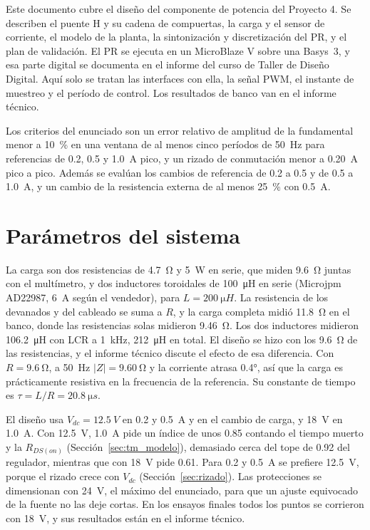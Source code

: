 \documentclass[journal]{IEEEtran}
\begin{document}
Este documento cubre el diseño del componente de potencia del Proyecto 4. Se describen el puente H y su cadena de compuertas, la carga y el sensor de corriente, el modelo de la planta, la sintonización y discretización del PR, y el plan de validación. El PR se ejecuta en un MicroBlaze V sobre una Basys~3, y esa parte digital se documenta en el informe del curso de Taller de Diseño Digital. Aquí solo se tratan las interfaces con ella, la señal PWM, el instante de muestreo y el período de control. Los resultados de banco van en el informe técnico.

Los criterios del enunciado \cite{enunciado} son un error relativo de amplitud de la fundamental menor a \SI{10}{\percent} en una ventana de al menos cinco períodos de \SI{50}{Hz} para referencias de \num{0.2}, \num{0.5} y \SI{1.0}{A} pico, y un rizado de conmutación menor a \SI{0.20}{A} pico a pico. Además se evalúan los cambios de referencia de \num{0.2} a \num{0.5} y de \num{0.5} a \SI{1.0}{A}, y un cambio de la resistencia externa de al menos \SI{25}{\percent} con \SI{0.5}{A}.

\section{Parámetros del sistema}
\label{sec:param}
La carga son dos resistencias de \SI{4.7}{\ohm} y \SI{5}{W} en serie, que miden \SI{9.6}{\ohm} juntas con el multímetro, y dos inductores toroidales de \SI{100}{\micro H} en serie (Microjpm AD22987, \SI{6}{A} según el vendedor), para $L=\SI{200}{\micro H}$. La resistencia de los devanados y del cableado se suma a $R$, y la carga completa midió \SI{11.8}{\ohm} en el banco, donde las resistencias solas midieron \SI{9.46}{\ohm}. Los dos inductores midieron \SI{106.2}{\micro H} con LCR a \SI{1}{kHz}, \SI{212}{\micro H} en total. El diseño se hizo con los \SI{9.6}{\ohm} de las resistencias, y el informe técnico discute el efecto de esa diferencia. Con $R=\SI{9.6}{\ohm}$, a \SI{50}{Hz} $|Z|=\SI{9.60}{\ohm}$ y la corriente atrasa \ang{0.4}, así que la carga es prácticamente resistiva en la frecuencia de la referencia. Su constante de tiempo es $\tau=L/R=\SI{20.8}{\micro s}$.

El diseño usa $V_{dc}=\SI{12.5}{V}$ en \num{0.2} y \SI{0.5}{A} y en el cambio de carga, y \SI{18}{V} en \SI{1.0}{A}. Con \SI{12.5}{V}, \SI{1.0}{A} pide un índice de unos \num{0.85} contando el tiempo muerto y la $R_{DS(on)}$ (Sección~\ref{sec:tm_modelo}), demasiado cerca del tope de \num{0.92} del regulador, mientras que con \SI{18}{V} pide \num{0.61}. Para \num{0.2} y \SI{0.5}{A} se prefiere \SI{12.5}{V}, porque el rizado crece con $V_{dc}$ (Sección~\ref{sec:rizado}). Las protecciones se dimensionan con \SI{24}{V}, el máximo del enunciado, para que un ajuste equivocado de la fuente no las deje cortas. En los ensayos finales todos los puntos se corrieron con \SI{18}{V}, y sus resultados están en el informe técnico.
\end{document}
